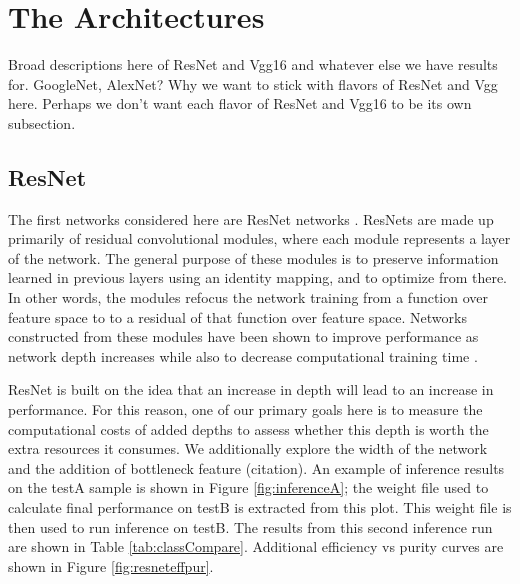 \documentclass[11pt,a4paper]{article}
\begin{document}
\section {The Architectures}
Broad descriptions here of ResNet and Vgg16 and whatever else we have results for.  GoogleNet, AlexNet?
Why we want to stick with flavors of ResNet and Vgg here. Perhaps we don't want each flavor of ResNet and Vgg16 to be its own subsection.

\subsection{ResNet}
The first networks considered here are ResNet networks \cite{bib:resnet}. ResNets are made up primarily of residual convolutional modules, where each module represents a layer of the network. The general purpose of these modules is to preserve information learned in previous layers using an identity mapping, and to optimize from there. In other words, the modules refocus the network training from a function over feature space to to a residual of that function over feature space. Networks constructed from these modules have been shown to improve performance as network depth increases while also to decrease computational training time \cite{bib:resmodule}.  

\par ResNet is built on the idea that an increase in depth will lead to an increase in performance. For this reason, one of our primary goals here is to measure the computational costs of added depths to assess whether this depth is worth the extra resources it consumes. We additionally explore the width of the network and the addition of bottleneck feature (citation).  An example of inference results on the testA sample is shown in Figure \ref{fig:inferenceA}; the weight file used to calculate final performance on testB is extracted from this plot.  This weight file is then used to run inference on testB.  The results from this second inference run are shown in Table \ref{tab:classCompare}. Additional efficiency vs purity curves are shown in Figure \ref{fig:resneteffpur}.\\
\end{document}
